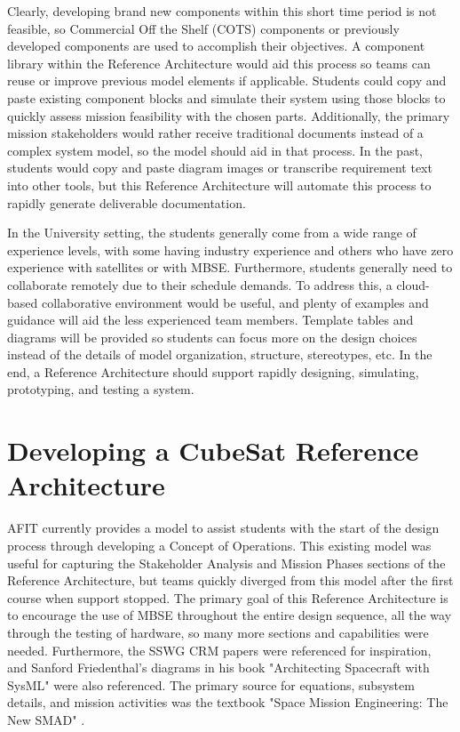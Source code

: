 \documentclass[conference]{joss-pretty}
\begin{document}
Clearly, developing brand new components within this short time period is not feasible, so Commercial Off the Shelf (COTS) components or previously developed components are used to accomplish their objectives. A component library within the Reference Architecture would aid this process so teams can reuse or improve previous model elements if applicable. Students could copy and paste existing component blocks and simulate their system using those blocks to quickly assess mission feasibility with the chosen parts. Additionally, the primary mission stakeholders would rather receive traditional documents instead of a complex system model, so the model should aid in that process. In the past, students would copy and paste diagram images or transcribe requirement text into other tools, but this Reference Architecture will automate this process to rapidly generate deliverable documentation.

In the University setting, the students generally come from a wide range of experience levels, with some having industry experience and others who have zero experience with satellites or with MBSE. Furthermore, students generally need to collaborate remotely due to their schedule demands. To address this, a cloud-based collaborative environment would be useful, and plenty of examples and guidance will aid the less experienced team members. Template tables and diagrams will be provided so students can focus more on the design choices instead of the details of model organization, structure, stereotypes, etc. In the end, a Reference Architecture should support rapidly designing, simulating, prototyping, and testing a system. 


\section{Developing a CubeSat Reference Architecture}
AFIT currently provides a model to assist students with the start of the design process through developing a Concept of Operations. This existing model was useful for capturing the Stakeholder Analysis and Mission Phases sections of the Reference Architecture, but teams quickly diverged from this model after the first course when support stopped. The primary goal of this Reference Architecture is to encourage the use of MBSE throughout the entire design sequence, all the way through the testing of hardware, so many more sections and capabilities were needed. Furthermore, the SSWG CRM papers were referenced for inspiration, and Sanford Friedenthal's diagrams in his book "Architecting Spacecraft with SysML" \citep{FriedenthalArchitectingSpacecraft} were also referenced. The primary source for equations, subsystem details, and mission activities was the textbook "Space Mission Engineering: The New SMAD" \citep{Wertz2011SpaceSMAD}.
\end{document}
